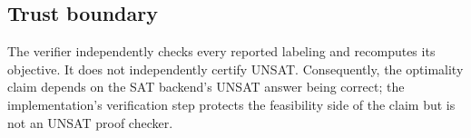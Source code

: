 \subsection{Trust boundary}
The verifier independently checks every reported labeling and recomputes its
objective. It does not independently certify UNSAT. Consequently, the
optimality claim depends on the SAT backend's UNSAT answer being correct;
the implementation's verification step protects the feasibility side of the
claim but is not an UNSAT proof checker.
